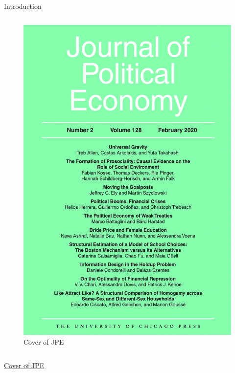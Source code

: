 \documentclass[
  ignorenonframetext,
]{beamer}
\begin{document}
\begin{frame}{Introduction}
\begin{columns}[T]
\begin{column}{0.4\textwidth}
\begin{figure}
{\centering \includegraphics{_Slides_files/mediabag/jpe-jan2020.jpg}

}

\caption{Cover of JPE}

\end{figure}
\end{column}
\end{columns}

\href{https://economics.sas.upenn.edu/sites/default/files/2020-02/jpe\%20jan2020.jpg}{Cover
of JPE}
\end{frame}
\end{document}
